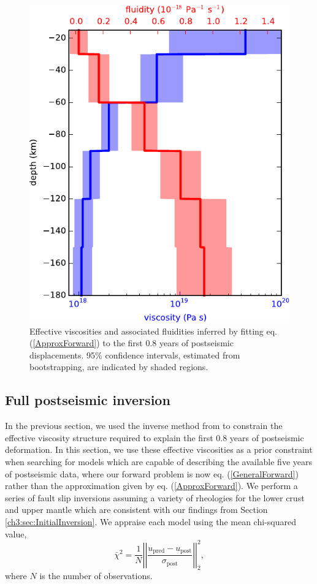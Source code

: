 \begin{figure}
\includegraphics[scale=1.0]{ch3/figures/2016jb013114-p12}
\caption{Effective viscosities and associated fluidities inferred by fitting eq. (\ref{ApproxForward}) to the first 0.8 years of postseismic displacements. 95\% confidence intervals, estimated from bootstrapping, are indicated by shaded regions.}
\label{ch3:fig:EffectiveViscosity}
\end{figure} 

\subsection{Full postseismic inversion}\label{ch3:sec:FullInversion} 
In the previous section, we used the inverse method from \citet{Hines2016} to constrain the effective viscosity structure required to explain the first 0.8 years of postseismic deformation. In this section, we use these effective viscosities as a prior constraint when searching for models which are capable of describing the available five years of postseismic data, where our forward problem is now eq. (\ref{GeneralForward}) rather than the approximation given by eq. (\ref{ApproxForward}).  We perform a series of fault slip inversions assuming a variety of rheologies for the lower crust and upper mantle which are consistent with our findings from Section \ref{ch3:sec:InitialInversion}.  We appraise each model using the mean chi-squared value,
\begin{equation}\label{ch3:eq:Misfit}
  \bar\chi^2 = \frac{1}{N}\left|\left|\frac{u_\mathrm{pred} - u_\mathrm{post}}{\sigma_\mathrm{post}}\right|\right|_2^2,
\end{equation}
where $N$ is the number of observations.

